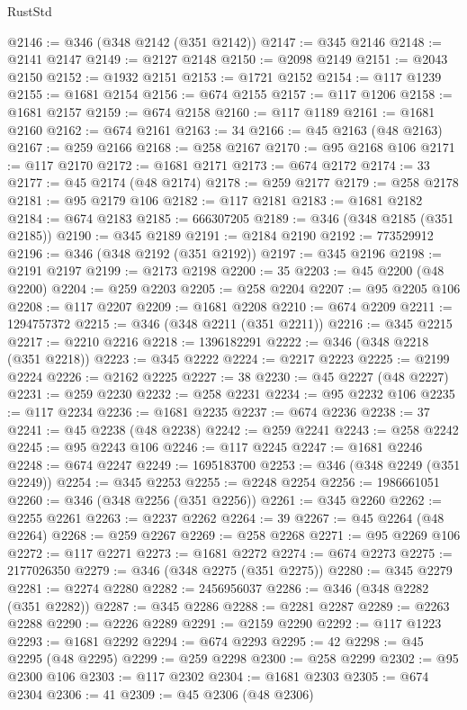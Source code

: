 \begin{lexlean}{RustStd}
\begin{coremodule}
@2146 := @346 (@348 @2142 (@351 @2142))
@2147 := @345 @2146
@2148 := @2141 @2147
@2149 := @2127 @2148
@2150 := @2098 @2149
@2151 := @2043 @2150
@2152 := @1932 @2151
@2153 := @1721 @2152
@2154 := @117 @1239
@2155 := @1681 @2154
@2156 := @674 @2155
@2157 := @117 @1206
@2158 := @1681 @2157
@2159 := @674 @2158
@2160 := @117 @1189
@2161 := @1681 @2160
@2162 := @674 @2161
@2163 := 34
@2166 := @45 @2163 (@48 @2163)
@2167 := @259 @2166
@2168 := @258 @2167
@2170 := @95 @2168 @106
@2171 := @117 @2170
@2172 := @1681 @2171
@2173 := @674 @2172
@2174 := 33
@2177 := @45 @2174 (@48 @2174)
@2178 := @259 @2177
@2179 := @258 @2178
@2181 := @95 @2179 @106
@2182 := @117 @2181
@2183 := @1681 @2182
@2184 := @674 @2183
@2185 := 666307205
@2189 := @346 (@348 @2185 (@351 @2185))
@2190 := @345 @2189
@2191 := @2184 @2190
@2192 := 773529912
@2196 := @346 (@348 @2192 (@351 @2192))
@2197 := @345 @2196
@2198 := @2191 @2197
@2199 := @2173 @2198
@2200 := 35
@2203 := @45 @2200 (@48 @2200)
@2204 := @259 @2203
@2205 := @258 @2204
@2207 := @95 @2205 @106
@2208 := @117 @2207
@2209 := @1681 @2208
@2210 := @674 @2209
@2211 := 1294757372
@2215 := @346 (@348 @2211 (@351 @2211))
@2216 := @345 @2215
@2217 := @2210 @2216
@2218 := 1396182291
@2222 := @346 (@348 @2218 (@351 @2218))
@2223 := @345 @2222
@2224 := @2217 @2223
@2225 := @2199 @2224
@2226 := @2162 @2225
@2227 := 38
@2230 := @45 @2227 (@48 @2227)
@2231 := @259 @2230
@2232 := @258 @2231
@2234 := @95 @2232 @106
@2235 := @117 @2234
@2236 := @1681 @2235
@2237 := @674 @2236
@2238 := 37
@2241 := @45 @2238 (@48 @2238)
@2242 := @259 @2241
@2243 := @258 @2242
@2245 := @95 @2243 @106
@2246 := @117 @2245
@2247 := @1681 @2246
@2248 := @674 @2247
@2249 := 1695183700
@2253 := @346 (@348 @2249 (@351 @2249))
@2254 := @345 @2253
@2255 := @2248 @2254
@2256 := 1986661051
@2260 := @346 (@348 @2256 (@351 @2256))
@2261 := @345 @2260
@2262 := @2255 @2261
@2263 := @2237 @2262
@2264 := 39
@2267 := @45 @2264 (@48 @2264)
@2268 := @259 @2267
@2269 := @258 @2268
@2271 := @95 @2269 @106
@2272 := @117 @2271
@2273 := @1681 @2272
@2274 := @674 @2273
@2275 := 2177026350
@2279 := @346 (@348 @2275 (@351 @2275))
@2280 := @345 @2279
@2281 := @2274 @2280
@2282 := 2456956037
@2286 := @346 (@348 @2282 (@351 @2282))
@2287 := @345 @2286
@2288 := @2281 @2287
@2289 := @2263 @2288
@2290 := @2226 @2289
@2291 := @2159 @2290
@2292 := @117 @1223
@2293 := @1681 @2292
@2294 := @674 @2293
@2295 := 42
@2298 := @45 @2295 (@48 @2295)
@2299 := @259 @2298
@2300 := @258 @2299
@2302 := @95 @2300 @106
@2303 := @117 @2302
@2304 := @1681 @2303
@2305 := @674 @2304
@2306 := 41
@2309 := @45 @2306 (@48 @2306)

\end{coremodule}
\end{lexlean}
